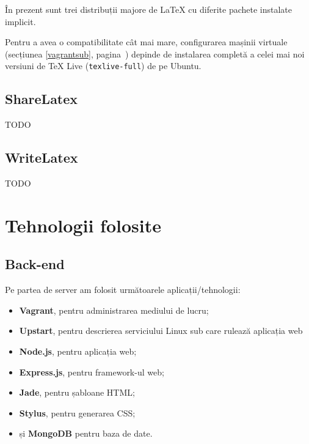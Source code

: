 \documentclass[a4wide,12pt]{report}
\newcommand{\eng}[1]{{#1}} %
\newcommand{\cod}[1]{\texttt{#1}}
\newcommand{\idee}[1]{{\color{red} #1}}
\begin{document}
În prezent sunt trei distribuții\cite{majordist} majore de \LaTeX{} cu diferite
pachete instalate implicit.

Pentru a avea o compatibilitate cât mai mare, configurarea mașinii virtuale
(secțiunea \ref{vagrantsub}, pagina~\pageref{vagrantsub}) depinde de instalarea
completă a celei mai noi versiuni de \TeX{} Live (\cod{texlive-full}) de pe
Ubuntu.

\section{ShareLatex}

\idee{TODO}

\section{WriteLatex}

\idee{TODO}

\chapter{Tehnologii folosite}

\section{\eng{Back-end}}

Pe partea de server am folosit următoarele aplicații/tehnologii:

\begin{itemize}

\item \textbf{Vagrant}, pentru administrarea mediului de lucru;

\item \textbf{Upstart}, pentru descrierea serviciului Linux sub care rulează
aplicația web

\item \textbf{Node.js}, pentru aplicația web;

\item \textbf{Express.js}, pentru \eng{framework}-ul web;

\item \textbf{Jade}, pentru șabloane HTML;

\item \textbf{Stylus}, pentru generarea CSS;

\item și \textbf{MongoDB} pentru baza de date.

\end{itemize}
\end{document}
